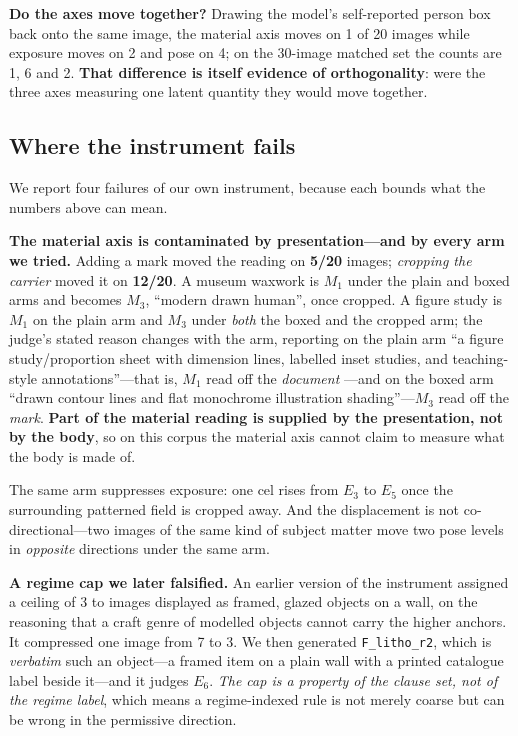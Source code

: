 \documentclass[11pt]{article}
\newcommand{\axm}{M}
\newcommand{\axe}{E}
\begin{document}
\textbf{Do the axes move together?} Drawing the model's self-reported person box
back onto the same image, the material axis moves on 1 of 20 images while exposure
moves on 2 and pose on 4; on the 30-image matched set the counts are 1, 6 and 2.
\textbf{That difference is itself evidence of orthogonality}: were the three axes
measuring one latent quantity they would move together.

\subsection{Where the instrument fails}
\label{sec:instrfail}

We report four failures of our own instrument, because each bounds what the numbers
above can mean.

\textbf{The material axis is contaminated by presentation---and by every arm we
tried.} Adding a mark moved the reading on \textbf{5/20} images; \emph{cropping the
carrier} moved it on \textbf{12/20}. A museum waxwork is $\axm_1$ under the plain
and boxed arms and becomes $\axm_3$, ``modern drawn human'', once cropped. A figure
study is $\axm_1$ on the plain arm and $\axm_3$ under \emph{both} the boxed and the
cropped arm; the judge's stated reason changes with the arm, reporting on the plain
arm ``a figure study/proportion sheet with dimension lines, labelled inset studies,
and teaching-style annotations''---that is, $\axm_1$ read off the \emph{document}
---and on the boxed arm ``drawn contour lines and flat monochrome illustration
shading''---$\axm_3$ read off the \emph{mark}. \textbf{Part of the material reading
is supplied by the presentation, not by the body}, so on this corpus the material
axis cannot claim to measure what the body is made of.

The same arm suppresses exposure: one cel rises from $\axe_3$ to $\axe_5$ once the
surrounding patterned field is cropped away. And the displacement is not
co-directional---two images of the same kind of subject matter move two pose levels
in \emph{opposite} directions under the same arm.

\textbf{A regime cap we later falsified.} An earlier version of the instrument
assigned a ceiling of 3 to images displayed as framed, glazed objects on a wall, on
the reasoning that a craft genre of modelled objects cannot carry the higher
anchors. It compressed one image from 7 to 3. We then generated
\texttt{F\_litho\_r2}, which is \emph{verbatim} such an object---a framed item on a
plain wall with a printed catalogue label beside it---and it judges $\axe_6$.
\emph{The cap is a property of the clause set, not of the regime label}, which means
a regime-indexed rule is not merely coarse but can be wrong in the permissive
direction.
\end{document}
